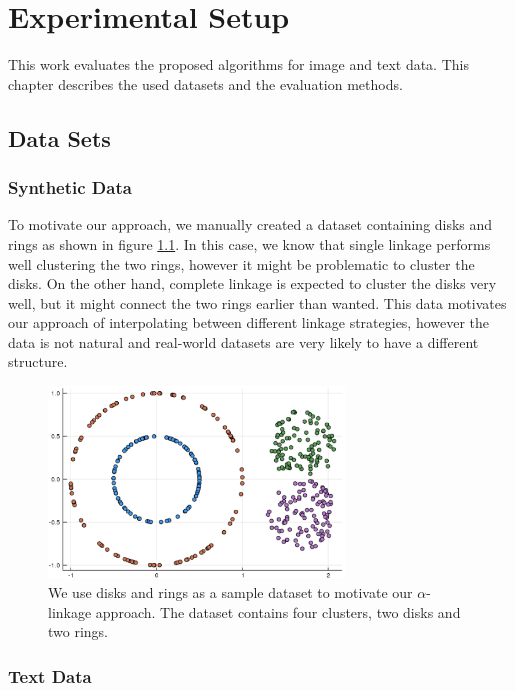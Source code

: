 \chapter{Experimental Setup}
\label{chapter:setup}

This work evaluates the proposed algorithms for image and text data. This chapter describes the used datasets and the evaluation methods.

\section{Data Sets}
\label{chapter:datasets}

\subsection{Synthetic Data}

To motivate our approach, we manually created a dataset containing disks and rings as shown in figure \ref{fig:disksrings}. In this case, we know that single linkage performs well clustering the two rings, however it might be problematic to cluster the disks. On the other hand, complete linkage is expected to cluster the disks very well, but it might connect the two rings earlier than wanted. This data motivates our approach of interpolating between different linkage strategies, however the data is not natural and real-world datasets are very likely to have a different structure. 

\begin{figure}[h]
    \centering
    \includegraphics[width=0.7\textwidth]{images/RingsDisks}
    \caption{We use disks and rings as a sample dataset to motivate our $\alpha$-linkage approach. The dataset contains four clusters, two disks and two rings.}
    \label{fig:disksrings}
\end{figure}

\subsection{Text Data}

